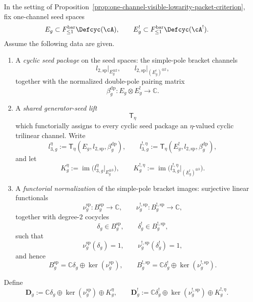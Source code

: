 \begin{proposition}\label{prop:one-channel-canonical-transfer-criterion}
In the setting of
Proposition~\textup{\ref{prop:one-channel-visible-lowarity-packet-criterion}},
fix one-channel seed spaces
\[
E_g \subset F_{\leq 1}^{\mathrm{bar}}\Defcyc(\cA),
\qquad
E_g^! \subset F_{\leq 1}^{\mathrm{bar}}\Defcyc(\cA^!).
\]
Assume the following data are given.
\begin{enumerate}[label=\textup{(\roman*)}]
\item A \emph{cyclic seed package} on the seed spaces:
  the simple-pole bracket channels
  \[
  l_{2,\mathrm{sp}}\big|_{E_g^{\otimes 2}},
  \qquad
  l_{2,\mathrm{sp}}\big|_{(E_g^!)^{\otimes 2}},
  \]
  together with the normalized double-pole pairing matrix
  \[
  \beta_g^{\mathrm{dp}} \colon E_g \otimes E_g^! \longrightarrow \mathbb{C}.
  \]
\item A \emph{shared generator-seed lift}
  \[
  \mathsf{T}_\eta
  \]
  which functorially assigns to every cyclic seed package an
  $\eta$-valued cyclic trilinear channel.  Write
  \[
  l_{3,g}^\eta
  :=
  \mathsf{T}_\eta(E_g,l_{2,\mathrm{sp}},\beta_g^{\mathrm{dp}}),
  \qquad
  l_{3,g}^{!,\eta}
  :=
  \mathsf{T}_\eta(E_g^!,l_{2,\mathrm{sp}},\beta_g^{\mathrm{dp}}),
  \]
  and let
  \[
  K_g^\eta
  :=
  \operatorname{im}\!\bigl(
    l_{3,g}^\eta\big|_{E_g^{\otimes 3}}
  \bigr),
  \qquad
  K_g^{!,\eta}
  :=
  \operatorname{im}\!\bigl(
    l_{3,g}^{!,\eta}\big|_{(E_g^!)^{\otimes 3}}
  \bigr).
  \]
\item A \emph{functorial normalization} of the simple-pole bracket
  images: surjective linear functionals
  \[
  \nu_g^{\mathrm{sp}}\colon B_g^{\mathrm{sp}}\to\mathbb{C},
  \qquad
  \nu_g^{!,\mathrm{sp}}\colon B_g^{!,\mathrm{sp}}\to\mathbb{C},
  \]
  together with degree-$2$ cocycles
  \[
  \delta_g \in B_g^{\mathrm{sp}},
  \qquad
  \delta_g^! \in B_g^{!,\mathrm{sp}},
  \]
  such that
  \[
  \nu_g^{\mathrm{sp}}(\delta_g)=1,
  \qquad
  \nu_g^{!,\mathrm{sp}}(\delta_g^!)=1,
  \]
  and hence
  \[
  B_g^{\mathrm{sp}}
  =
  \mathbb{C}\delta_g \oplus \ker(\nu_g^{\mathrm{sp}}),
  \qquad
  B_g^{!,\mathrm{sp}}
  =
  \mathbb{C}\delta_g^! \oplus \ker(\nu_g^{!,\mathrm{sp}}).
  \]
\end{enumerate}
Define
\[
\mathbf{D}_g
:=
\mathbb{C}\delta_g \oplus \ker(\nu_g^{\mathrm{sp}}) \oplus K_g^\eta,
\qquad
\mathbf{D}_g^!
:=
\mathbb{C}\delta_g^! \oplus \ker(\nu_g^{!,\mathrm{sp}}) \oplus K_g^{!,\eta}.
\]
\end{proposition}

